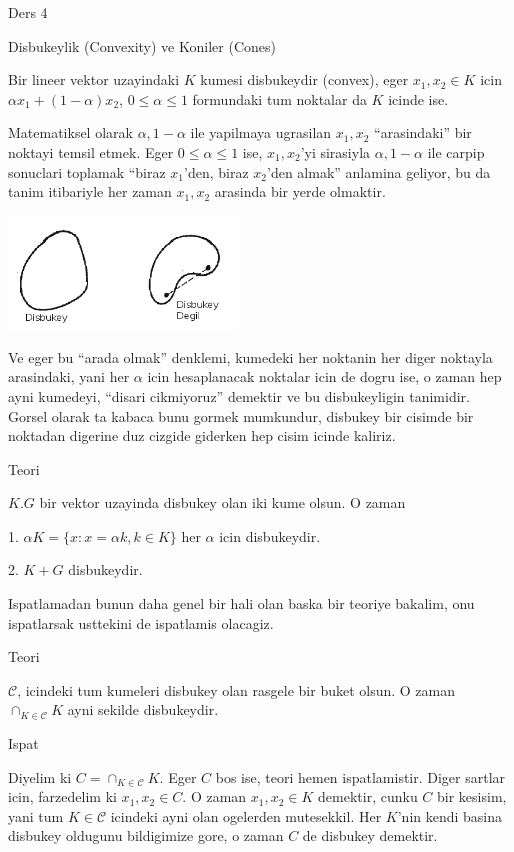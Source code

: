 \documentclass[12pt,fleqn]{article}
\begin{document}
Ders 4

Disbukeylik (Convexity) ve Koniler (Cones)

Bir lineer vektor uzayindaki $K$ kumesi disbukeydir (convex), eger 
$x_1,x_2
\in K$ icin $\alpha x_1 + (1-\alpha)x_2$, $0 \le \alpha \le 1$ formundaki
tum noktalar da $K$ icinde ise.

Matematiksel olarak $\alpha,1-\alpha$ ile yapilmaya ugrasilan $x_1,x_2$
``arasindaki'' bir noktayi temsil etmek. Eger $0 \le \alpha \le 1$ ise,
$x_1,x_2$'yi sirasiyla $\alpha,1-\alpha$ ile carpip sonuclari toplamak
``biraz $x_1$'den, biraz $x_2$'den almak'' anlamina geliyor, bu da tanim
itibariyle her zaman $x_1,x_2$ arasinda bir yerde olmaktir. 

\includegraphics[height=3cm]{4_1.png}

Ve eger bu ``arada olmak'' denklemi, kumedeki her noktanin her diger
noktayla arasindaki, yani her $\alpha$ icin hesaplanacak noktalar icin de
dogru ise, o zaman hep ayni kumedeyi, ``disari cikmiyoruz'' demektir ve bu
disbukeyligin tanimidir. Gorsel olarak ta kabaca bunu gormek mumkundur,
disbukey bir cisimde bir noktadan digerine duz cizgide giderken hep cisim
icinde kaliriz.

Teori 

$K.G$ bir vektor uzayinda disbukey olan iki kume olsun. O zaman 

1. $\alpha K = \{x: x = \alpha k, k \in K\}$ her $\alpha$ icin disbukeydir. 

2. $K+G$ disbukeydir. 

Ispatlamadan bunun daha genel bir hali olan baska bir teoriye bakalim, onu
ispatlarsak usttekini de ispatlamis olacagiz. 

Teori 

$\mathscr{C}$, icindeki tum kumeleri disbukey olan rasgele bir buket
olsun. O zaman $\cap_{K \in \mathscr{C}}K$ ayni sekilde disbukeydir. 

Ispat

Diyelim ki $C = \cap_{K \in \mathscr{C}}K$. Eger $C$ bos ise, teori hemen
ispatlamistir. Diger sartlar icin, farzedelim ki $x_1,x_2 \in C$. O zaman
$x_1,x_2 \in K$ demektir, cunku $C$ bir kesisim, yani tum $K \in \mathscr{C}$
icindeki ayni olan ogelerden mutesekkil. Her $K$'nin kendi basina disbukey
oldugunu bildigimize gore, o zaman $C$ de disbukey demektir. 
\end{document}
